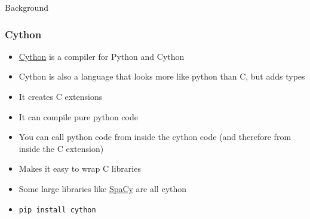 \documentclass{beamer}
\theoremstyle{case}
\begin{document}
\begin{section}{Background}
\begin{frame}
    \frametitle{Cython}
    \begin{itemize}
        \item<1-> \href{https://cython.org/}{Cython} is a compiler for Python and Cython
        \item<2-> Cython is also a language that looks more like python than C, but adds types
        \item<3-> It creates C extensions
        \item<4-> It can compile pure python code
        \item<5-> You can call python code from inside the cython code (and therefore from inside the C extension)
        \item<6-> Makes it easy to wrap C libraries
        \item<7-> Some large libraries like \href{https://spacy.io/}{SpaCy} are all cython
        \item<8-> \texttt{pip install cython}
    \end{itemize}
\end{frame}

\end{section} %
\end{document}
